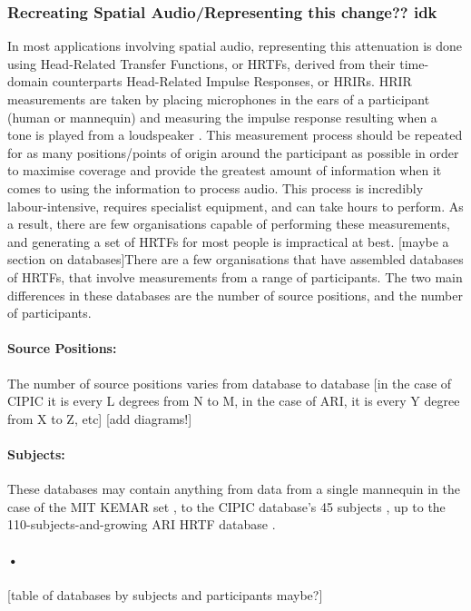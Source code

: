 \subsubsection{Recreating Spatial Audio/Representing this change?? idk}
In most applications involving spatial audio, representing this attenuation is done using Head-Related Transfer Functions, or HRTFs, derived from their time-domain counterparts Head-Related Impulse Responses, or HRIRs. HRIR measurements are taken by placing microphones in the ears of a participant (human or mannequin) and measuring the impulse response resulting when a tone is played from a loudspeaker \citep{who did this first?}. This measurement process should be repeated for as many positions/points of origin around the participant as possible in order to maximise coverage and provide the greatest amount of information when it comes to using the information to process audio. This process is incredibly labour-intensive, requires specialist equipment, and can take hours to perform. As a result, there are few organisations capable of performing these measurements, and generating a set of HRTFs for most people is impractical at best. [maybe a section on databases]There are a few organisations that have assembled databases of HRTFs, that involve measurements from a range of participants. The two main differences in these databases are the number of source positions, and the number of participants. 

\paragraph{Source Positions:}The number of source positions varies from database to database [in the case of CIPIC it is every L degrees from N to M, in the case of ARI, it is every Y degree from X to Z, etc]
[add diagrams!]

\paragraph{Subjects:}
These databases may contain anything from data from a single mannequin in the case of the MIT KEMAR set \citep{Gardner1994}, to the CIPIC database's 45 subjects \citep{Algazi2001}, up to the 110-subjects-and-growing ARI HRTF database \citep{AcousticsResearchInstitute}. 

\paragraph{•}
[table of databases by subjects and participants maybe?]

